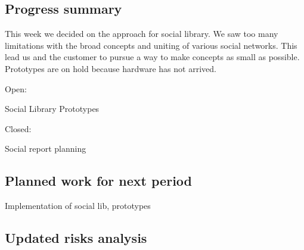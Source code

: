 \subsection{Progress summary}

This week we decided on the approach for social library. We saw too many limitations with the broad concepts and uniting of various social networks. This lead us and the customer to pursue a way to make concepts as small as possible. Prototypes are on hold because hardware has not arrived.


Open:

Social Library
Prototypes

Closed:

Social report planning


\subsection{Planned work for next period}

Implementation of social lib, prototypes

\subsection{Updated risks analysis}

